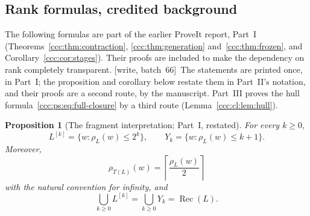 \documentclass[11pt,letterpaper]{article}
\newtheorem{proposition}[theorem]{Proposition}
\theoremstyle{definition}
\theoremstyle{remark}
\newcommand{\rec}{\operatorname{Rec}}
\newcommand{\gen}[2]{#1^{[#2]}}
\newcommand{\rank}{\rho}
\newcommand{\wsix}{\textup{[write, batch~66]}}
\begin{document}
\subsection{Rank formulas, credited background}

The following formulas are part of the earlier ProveIt report, Part~I
(Theorems~\ref{ccc:thm:contraction}, \ref{ccc:thm:generation}
and~\ref{ccc:thm:frozen}, and Corollary~\ref{ccc:cor:stages}).
Their proofs are included to make the dependency on rank completely
transparent. \wsix\ The statements are printed once, in Part~I; the
proposition and corollary below restate them in Part~II's notation, and their
proofs are a second route, by the manuscript. Part~III proves the hull
formula~\eqref{ccc:ps:eq:full-closure} by a third route
(Lemma~\ref{ccc:cl:lem:hull}).

\begin{proposition}[The fragment interpretation; Part~I, restated]\label{ccc:ps:prop:rank-clock}
For every $k\ge0$,
\begin{equation}\label{ccc:ps:eq:clocks}
 \gen Lk=\{w:\rank_L(w)\le2^k\},\qquad
 Y_k=\{w:\rank_L(w)\le k+1\}.
\end{equation}
Moreover,
\begin{equation}\label{ccc:ps:eq:rank-halving}
 \rank_{T(L)}(w)=\left\lceil\frac{\rank_L(w)}2\right\rceil
\end{equation}
with the natural convention for infinity, and
\begin{equation}\label{ccc:ps:eq:full-closure}
 \bigcup_{k\ge0}\gen Lk=\bigcup_{k\ge0}Y_k=\rec(L).
\end{equation}
\end{proposition}
\end{document}
